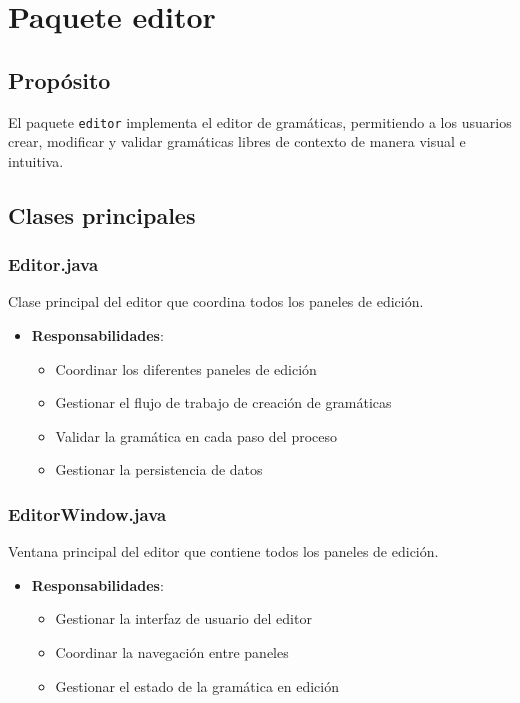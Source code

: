 \section{Paquete editor}

\subsection{Propósito}

El paquete \texttt{editor} implementa el editor de gramáticas, permitiendo a los usuarios crear, modificar y validar gramáticas libres de contexto de manera visual e intuitiva.

\subsection{Clases principales}

\subsubsection{Editor.java}

Clase principal del editor que coordina todos los paneles de edición.

\begin{itemize}
    \item \textbf{Responsabilidades}:
    \begin{itemize}
        \item Coordinar los diferentes paneles de edición
        \item Gestionar el flujo de trabajo de creación de gramáticas
        \item Validar la gramática en cada paso del proceso
        \item Gestionar la persistencia de datos
    \end{itemize}
\end{itemize}

\subsubsection{EditorWindow.java}

Ventana principal del editor que contiene todos los paneles de edición.

\begin{itemize}
    \item \textbf{Responsabilidades}:
    \begin{itemize}
        \item Gestionar la interfaz de usuario del editor
        \item Coordinar la navegación entre paneles
        \item Gestionar el estado de la gramática en edición
    \end{itemize}
\end{itemize}

